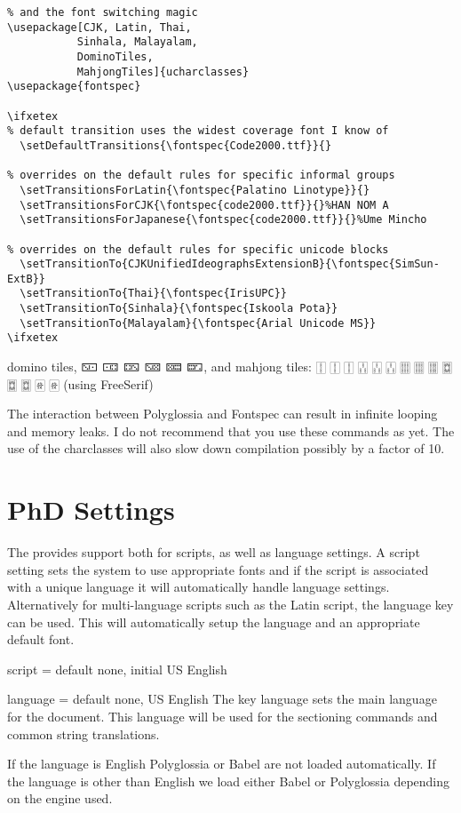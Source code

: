 \begin{verbatim}
% and the font switching magic
\usepackage[CJK, Latin, Thai, 
           Sinhala, Malayalam, 
           DominoTiles, 
           MahjongTiles]{ucharclasses}
\usepackage{fontspec}

\ifxetex
% default transition uses the widest coverage font I know of
  \setDefaultTransitions{\fontspec{Code2000.ttf}}{}

% overrides on the default rules for specific informal groups
  \setTransitionsForLatin{\fontspec{Palatino Linotype}}{}
  \setTransitionsForCJK{\fontspec{code2000.ttf}}{}%HAN NOM A
  \setTransitionsForJapanese{\fontspec{code2000.ttf}}{}%Ume Mincho

% overrides on the default rules for specific unicode blocks
  \setTransitionTo{CJKUnifiedIdeographsExtensionB}{\fontspec{SimSun-ExtB}}
  \setTransitionTo{Thai}{\fontspec{IrisUPC}}
  \setTransitionTo{Sinhala}{\fontspec{Iskoola Pota}}
  \setTransitionTo{Malayalam}{\fontspec{Arial Unicode MS}}
\ifxetex
\end{verbatim}

{
\newfontfamily{}
domino tiles, 🁇 🀼 🁐 🁋 🁚 🁝, and mahjong tiles: 🀑 🀑 🀑 🀒 🀒 🀒 🀕 🀕 🀕 🀗 🀗 🀗 🀅 🀅 (using FreeSerif)

}

The interaction between Polyglossia and Fontspec can result in infinite looping and memory leaks. I do not recommend that you use these commands as yet. The use of the charclasses will also slow down compilation possibly by a factor of 10.



\section{PhD Settings}

The  provides support both for scripts, as well as language settings. A script setting sets the system to use appropriate fonts and if the script is associated with a unique language it will automatically handle language settings. Alternatively for multi-language scripts such as the Latin script, the language key can be used. This will automatically setup the language and an appropriate default font. 

\begin{docKey}[phd]{script} { = } {default none, initial US English}{}
\end{docKey}

\begin{docKey}{language}{ =}  {default none, US English}
The key language sets the main language for the document. This language will be used for the sectioning commands and common string translations.

If the language is English Polyglossia or Babel are not loaded automatically. If the language is other than English we load either Babel or Polyglossia depending on the engine used.
\end{docKey}


